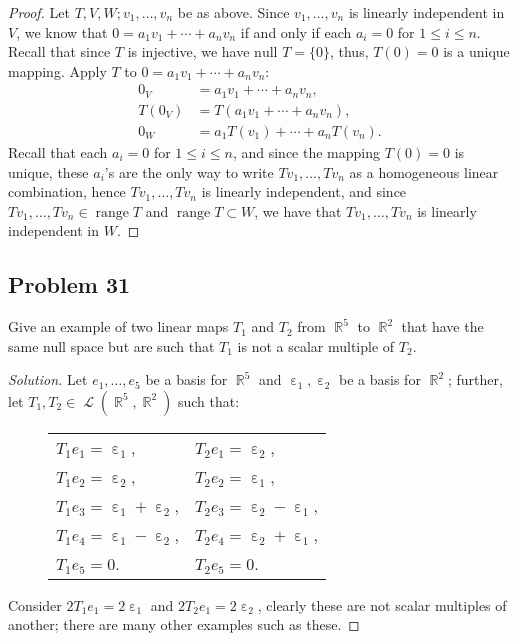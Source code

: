 \documentclass[letterpaper, 12pt]{amsart}
\DeclareMathOperator{\R}{\mathbb{R}}				%
\DeclareMathOperator{\Ell}{\mathscr{L}}				%
\DeclareMathOperator{\ep}{\varepsilon}				%
\renewcommand{\null}{\text{null }}					%
\DeclareMathOperator{\range}{\text{range }}			%
\theoremstyle{definition}  							%
\begin{document}
		\begin{proof}
		Let $T, V, W; v_{1}, \dots, v_{n}$ be as above.
		Since $v_{1}, \dots, v_{n}$ is linearly independent in $V$, we know that $0 = a_{1}v_{1} + \cdots + a_{n}v_{n}$ if and only if each $a_{i} = 0$ for $1 \leq i \leq n$.
		Recall that since $T$ is injective, we have $\null T = \{ 0 \}$, thus, $T(0) = 0$ is a unique mapping.
		Apply $T$ to $0 = a_{1}v_{1} + \cdots + a_{n}v_{n}$:
			\begin{align*}
				0_{V} &= a_{1}v_{1} + \cdots + a_{n}v_{n}, \\
				T(0_{V}) &= T(a_{1}v_{1} + \cdots + a_{n}v_{n}), \\
				0_{W} &= a_{1}T(v_{1}) + \cdots + a_{n}T(v_{n}).
			\end{align*}
		Recall that each $a_{i} = 0$ for $1 \leq i \leq n$, and since the mapping $T(0)=0$ is unique, these $a_{i}$'s are the only way to write $Tv_{1}, \dots, Tv_{n}$ as a homogeneous linear combination, hence $Tv_{1}, \dots, Tv_{n}$ is linearly independent, and since $Tv_{1}, \dots, Tv_{n} \in \range T$ and $\range T \subset W$, we have that $Tv_{1}, \dots, Tv_{n}$ is linearly independent in $W$.
		\end{proof}

		\subsection*{Problem 31}
		Give an example of two linear maps $T_{1}$ and $T_{2}$ from $\R^{5}$ to $\R^{2}$ that have the same null space but are such that $T_{1}$ is not a scalar multiple of $T_{2}$.

		\begin{proof}[Solution]
		Let $e_{1}, \dots, e_{5}$ be a basis for $\R^{5}$ and $\ep_{1}, \ep_{2}$ be a basis for $\R^{2}$; further, let $T_{1}, T_{2} \in \Ell(\R^{5}, \R^{2})$ such that:
			\begin{figure}[h]
				\begin{tabular}{ll}
					$T_{1}e_{1} = \ep_{1}$, & $T_{2}e_{1} = \ep_{2}$, \\
					$T_{1}e_{2} = \ep_{2}$, & $T_{2}e_{2} = \ep_{1}$, \\
					$T_{1}e_{3} = \ep_{1} + \ep_{2}$, & $T_{2}e_{3} = \ep_{2} - \ep_{1}$, \\
					$T_{1}e_{4} = \ep_{1} - \ep_{2}$, & $T_{2}e_{4} = \ep_{2} + \ep_{1}$, \\
					$T_{1}e_{5} = 0$. & $T_{2}e_{5} = 0$.
				\end{tabular}
			\end{figure}

		Consider $2T_{1}e_{1} = 2\ep_{1}$ and $2T_{2}e_{1} = 2\ep_{2}$, clearly these are not scalar multiples of another; there are many other examples such as these.
		\end{proof}
\end{document}
